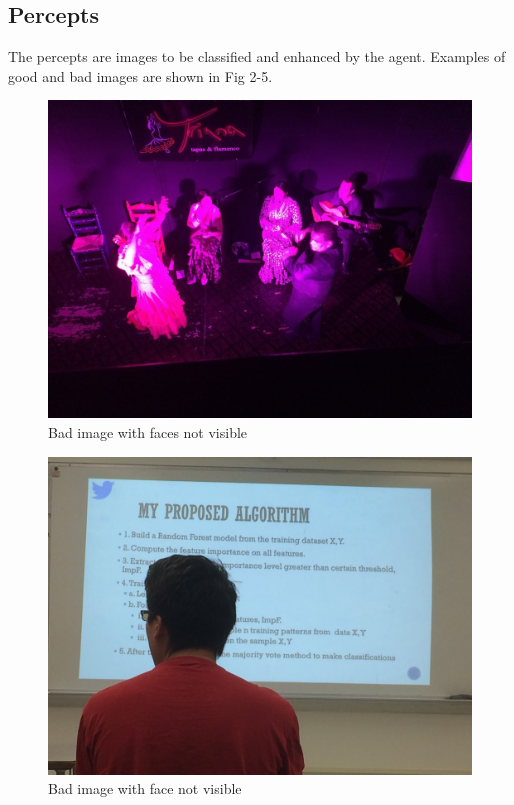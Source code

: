 \documentclass[11pt, a4paper]{article}
\begin{document}
\subsection{Percepts}
The percepts are images to be classified and enhanced by the agent. Examples of good and bad images are shown in Fig 2-5.
\begin{figure}[H]
\centering
\caption{Bad image with faces not visible}
\includegraphics[scale=0.17]{0NoFaceDance}
\end{figure}

\begin{figure}[H]
\centering
\caption{Bad image with face not visible}
\includegraphics[scale=0.17]{BackHead}
\end{figure}
\end{document}

